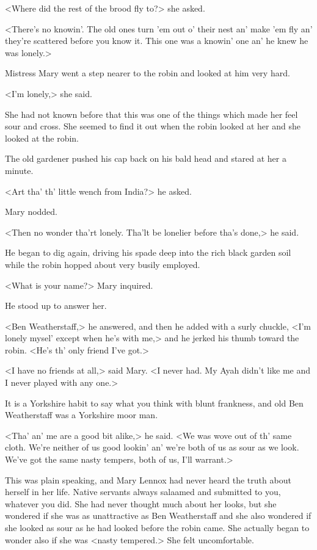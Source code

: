 <Where did the rest of the brood fly to?> she asked.

<There's no knowin'. The old ones turn 'em out o' their nest an' make 'em fly an' they're scattered before you know it. This one was a knowin' one an' he knew he was lonely.>

Mistress Mary went a step nearer to the robin and looked at him very hard.

<I'm lonely,> she said.

She had not known before that this was one of the things which made her feel sour and cross. She seemed to find it out when the robin looked at her and she looked at the robin.

The old gardener pushed his cap back on his bald head and stared at her a minute.

<Art tha' th' little wench from India?> he asked.

Mary nodded.

<Then no wonder tha'rt lonely. Tha'lt be lonelier before tha's done,> he said.

He began to dig again, driving his spade deep into the rich black garden soil while the robin hopped about very busily employed.

<What is your name?> Mary inquired.

He stood up to answer her.

<Ben Weatherstaff,> he answered, and then he added with a surly chuckle, <I'm lonely mysel' except when he's with me,> and he jerked his thumb toward the robin. <He's th' only friend I've got.>

<I have no friends at all,> said Mary. <I never had. My Ayah didn't like me and I never played with any one.>

It is a Yorkshire habit to say what you think with blunt frankness, and old Ben Weatherstaff was a Yorkshire moor man.

<Tha' an' me are a good bit alike,> he said. <We was wove out of th' same cloth. We're neither of us good lookin' an' we're both of us as sour as we look. We've got the same nasty tempers, both of us, I'll warrant.>

This was plain speaking, and Mary Lennox had never heard the truth about herself in her life. Native servants always salaamed and submitted to you, whatever you did. She had never thought much about her looks, but she wondered if she was as unattractive as Ben Weatherstaff and she also wondered if she looked as sour as he had looked before the robin came. She actually began to wonder also if she was <nasty tempered.> She felt uncomfortable.

